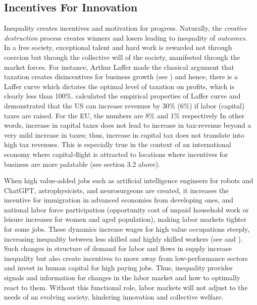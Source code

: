 \documentclass[12pt]{article}
\newcommand{\1}{\mathbbm 1}
\begin{document}
	
		
		
		
		
		
		
		
		
		
		
		
	
		
		\subsection{Incentives For Innovation}
		
	
		
Inequality creates incentives and motivation for progress. Naturally, the \textit{creative destruction} process creates winners and losers leading to inequality of \textit{outcomes}. In a free society, exceptional talent and hard work is rewarded not through coercion but through the collective will of the society, manifested through the market forces. For instance, Arthur Laffer made the classical argument that taxation creates disincentives for business growth (see \cite{laffer2004laffer}) and hence, there is a Laffer curve which dictates the optimal level of taxation on profits, which is clearly less than 100\%. \cite{trabandt2011laffer} calculated the empirical properties of Laffer curve and demonstrated that the US can increase revenues by 30\% (6\%) if labor (capital) taxes are raised. For the EU, the numbers are 8\% and 1\% respectively In other words, increase in capital taxes does not lead to increase in tax-revenue beyond a very mild increase in taxes; thus, increase in capital tax does not translate into high tax revenues. This is especially true in the context of an international economy where capital-flight is attracted to locations where incentives for business are more palatable (see section 3.2 above).


When high value-added jobs such as artificial intelligence engineers for robots and ChatGPT, astrophysicists, and neurosurgeons are created, it increases the incentive for immigration in advanced economies from developing ones, and national labor force participation (opportunity cost of unpaid household work or leisure increases for women and aged population), making labor markets tighter for some jobs. These dynamics increase wages for high value occupations steeply, increasing inequality between less skilled and highly skilled workers (see \cite{acemoglu2002technical} and \cite{acemoglu2020robots}). Such changes in structure of demand for labor and flows in supply increase inequality but also create incentives to move away from low-performance sectors and invest in human capital for high paying jobs. Thus, inequality provides signals and information for changes in the labor market and how to optimally react to them. Without this functional role, labor markets will not adjust to the needs of an evolving society, hindering innovation and collective welfare.
\end{document}
